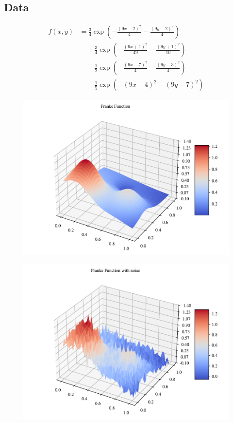 \subsection{Data}


\begin{align}
    f(x, y) &= \frac{3}{4} \exp\left( -\frac{(9x - 2)^2}{4} - \frac{(9y - 2)^2}{4} \right) \nonumber \\
    &\quad + \frac{3}{4} \exp\left( -\frac{(9x + 1)^2}{49} - \frac{(9y + 1)^2}{10} \right) \nonumber \\
    &\quad + \frac{1}{2} \exp\left( -\frac{(9x - 7)^2}{4} - \frac{(9y - 3)^2}{4} \right) \nonumber \\
    &\quad - \frac{1}{5} \exp\left( -(9x - 4)^2 - (9y - 7)^2 \right)
\end{align}


\begin{figure}[h!]
\centering
\includegraphics[width=1\linewidth]{project_1/figures/data/franke_func.pdf}
\caption{}
\label{franke}
\end{figure}

\begin{figure}[h!]
\centering
\includegraphics[width=1\linewidth]{project_1/figures/data/franke_func_noise.pdf}
\caption{}
\label{franke_noise}
\end{figure}



\gaute{}
